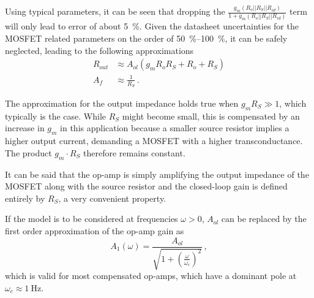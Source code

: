 \documentclass[12pt]{book}
\begin{document}
Using typical parameters, it can be seen that dropping the $\frac{g_m \left(R_o || R_S || R_{id}\right)}{1 + g_m \left(R_o || R_S || R_{id}\right)}$ term will only lead to error of about \qty{5}{\percent}. Given the datasheet uncertainties for the MOSFET related parameters on the order of \qtyrange{50}{100}{\percent}, it can be safely neglected, leading to the following approximations
\begin{align}
    R_{out} &\approx A_{ol} \left(g_m R_o R_S + R_o + R_S \right)\\
    A_f &\approx \frac{1}{R_S} \,. \nonumber
\end{align}

The approximation for the output impedance holds true when $g_m R_S \gg 1$, which typically is the case. While $R_S$ might become small, this is compensated by an increase in $g_m$ in this application because a smaller source resistor implies a higher output current, demanding a MOSFET with a higher transconductance. The product $g_m \cdot R_S$ therefore remains constant.

It can be said that the op-amp is simply amplifying the output impedance of the MOSFET along with the source resistor and the closed-loop gain is defined entirely by $R_S$, a very convenient property.

If the model is to be considered at frequencies $\omega > 0$, $A_{ol}$ can be replaced by the first order approximation of the op-amp gain as
\begin{equation}
    A_1 (\omega) = \frac{A_{ol}}{\sqrt{1 + \left(\frac{\omega}{\omega_c}\right)^2}}\,,\label{eqn:op-amp_gain}
\end{equation}
which is valid for most compensated op-amps, which have a dominant pole at $\omega_c \approx \qty{1}{\Hz}$.
\end{document}
